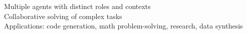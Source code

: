 \documentclass[preview]{standalone}
\begin{document}
Multiple agents with distinct roles and contexts\\Collaborative solving of complex tasks\\Applications: code generation, math problem-solving, research, data synthesis\\
\end{document}
